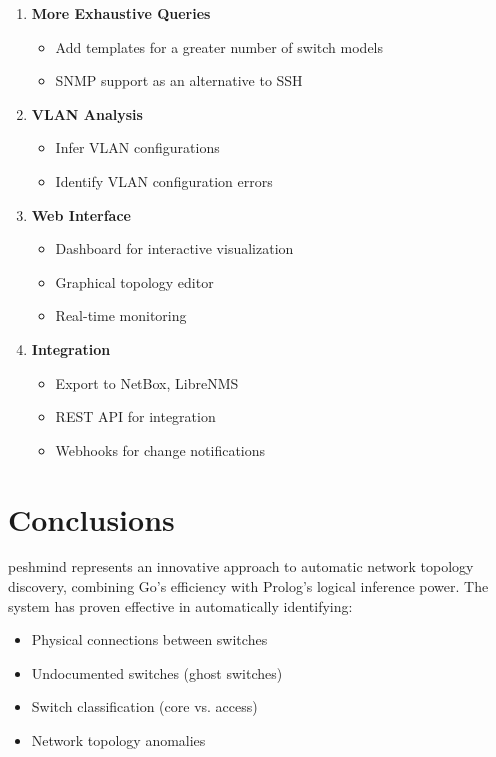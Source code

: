 \documentclass[12pt,a4paper]{article}
\begin{document}
\begin{enumerate}
    \item \textbf{More Exhaustive Queries}
    \begin{itemize}
        \item Add templates for a greater number of switch models
        \item SNMP support as an alternative to SSH
    \end{itemize}
    
    \item \textbf{VLAN Analysis}
    \begin{itemize}
        \item Infer VLAN configurations
        \item Identify VLAN configuration errors
    \end{itemize}
    
    \item \textbf{Web Interface}
    \begin{itemize}
        \item Dashboard for interactive visualization
        \item Graphical topology editor
        \item Real-time monitoring
    \end{itemize}
    
    \item \textbf{Integration}
    \begin{itemize}
        \item Export to NetBox, LibreNMS
        \item REST API for integration
        \item Webhooks for change notifications
    \end{itemize}
\end{enumerate}

\section{Conclusions}

peshmind represents an innovative approach to automatic network topology discovery, combining Go's efficiency with Prolog's logical inference power. The system has proven effective in automatically identifying:

\begin{itemize}
    \item Physical connections between switches
    \item Undocumented switches (ghost switches)
    \item Switch classification (core vs. access)
    \item Network topology anomalies
\end{itemize}
\end{document}
